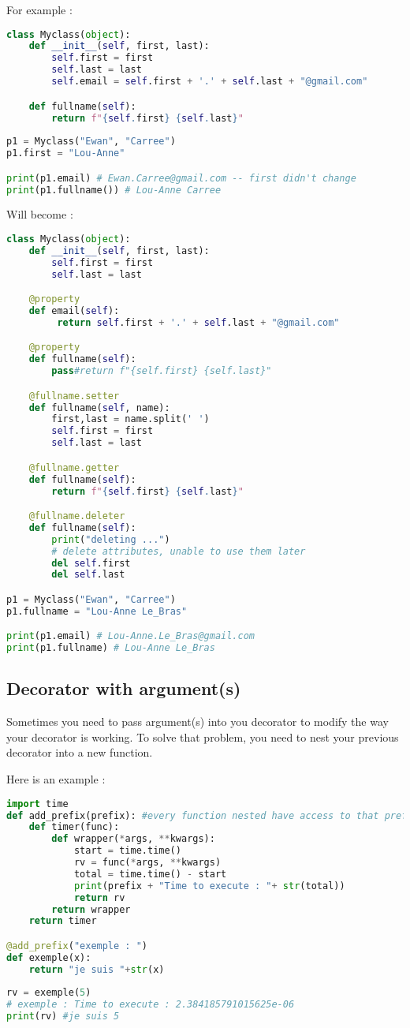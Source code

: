\documentclass[a4paper, 12pt, titlepage]{scrartcl} %
\begin{document}
For example :
\begin{lstlisting}[language=Python]
class Myclass(object):
	def __init__(self, first, last):
		self.first = first
		self.last = last
		self.email = self.first + '.' + self.last + "@gmail.com"

	def fullname(self):
		return f"{self.first} {self.last}"
		
p1 = Myclass("Ewan", "Carree")
p1.first = "Lou-Anne"

print(p1.email) # Ewan.Carree@gmail.com -- first didn't change
print(p1.fullname()) # Lou-Anne Carree
\end{lstlisting} \vspace{5mm}
Will become :
\label{Del}
\begin{lstlisting}[language=Python]
class Myclass(object):
	def __init__(self, first, last):
		self.first = first
		self.last = last

	@property
	def email(self):
		 return self.first + '.' + self.last + "@gmail.com"

	@property
	def fullname(self):
		pass#return f"{self.first} {self.last}"

	@fullname.setter
	def fullname(self, name):
		first,last = name.split(' ')
		self.first = first
		self.last = last

	@fullname.getter
	def fullname(self):
		return f"{self.first} {self.last}"

	@fullname.deleter
	def fullname(self):
		print("deleting ...")
		# delete attributes, unable to use them later
		del self.first 
		del self.last

p1 = Myclass("Ewan", "Carree")
p1.fullname = "Lou-Anne Le_Bras"

print(p1.email) # Lou-Anne.Le_Bras@gmail.com
print(p1.fullname) # Lou-Anne Le_Bras
\end{lstlisting} \vspace{5mm}

\subsection{Decorator with argument(s)}
Sometimes you need to pass argument(s) into you decorator to modify the way your decorator is working. To solve that problem, you need to nest your previous decorator into a new function. 

\vspace{5mm}

Here is an example :

\begin{lstlisting}[language=Python]
import time
def add_prefix(prefix): #every function nested have access to that prefix : enclosing
    def timer(func):
    	def wrapper(*args, **kwargs):
    		start = time.time()
    		rv = func(*args, **kwargs)
    		total = time.time() - start
    		print(prefix + "Time to execute : "+ str(total))
    		return rv
    	return wrapper
    return timer

@add_prefix("exemple : ")
def exemple(x):
	return "je suis "+str(x)
	
rv = exemple(5)
# exemple : Time to execute : 2.384185791015625e-06
print(rv) #je suis 5
\end{lstlisting} \vspace{5mm}
\end{document}
